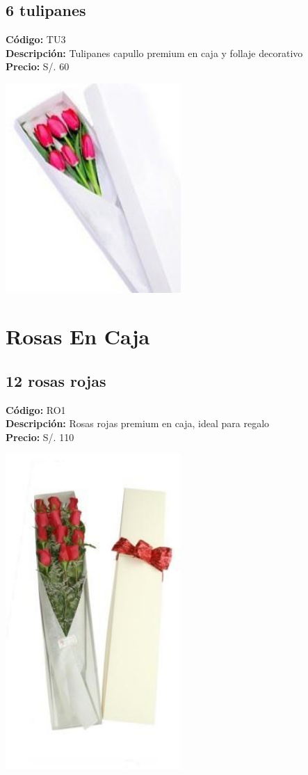 \subsection*{6 tulipanes}
\textbf{Código:} TU3 \\
\textbf{Descripción:} Tulipanes capullo premium en caja y follaje decorativo \\
\textbf{Precio:} S/. 60 \\
\begin{center}
\includegraphics[width=0.5\textwidth]{imagenes_extraidas/image_2_5}
\end{center}
\section*{Rosas En Caja}
\subsection*{12 rosas rojas}
\textbf{Código:} RO1 \\
\textbf{Descripción:} Rosas rojas premium en caja, ideal para regalo \\
\textbf{Precio:} S/. 110 \\
\begin{center}
\includegraphics[width=0.5\textwidth]{imagenes_extraidas/image_5_3}
\end{center}
